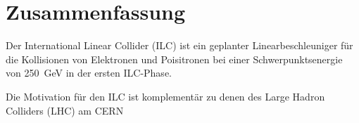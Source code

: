 \chapter*{Zusammenfassung}
Der International Linear Collider (ILC) ist ein geplanter Linearbeschleuniger f\"ur die Kollisionen von Elektronen und Poisitronen bei einer Schwerpunktsenergie von \SI{250}{\GeV} in der ersten ILC-Phase.

Die Motivation f\"ur den ILC ist komplement\"ar zu denen des Large Hadron Colliders (LHC) am CERN 